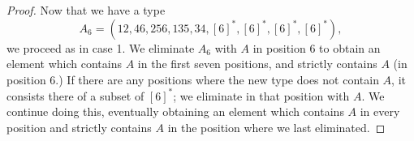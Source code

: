 \documentclass[11pt]{amsart}
\begin{document}
\begin{proof}
Now that we have a type 
\[
A_6=(12,46,256,135,34, [6]^*, [6]^*, [6]^*, [6]^*),
\]
we proceed as in case 1. We eliminate $A_6$ with $A$ in position 6 to obtain an element which contains $A$ in 
the first seven positions, and 
strictly contains $A$ (in position 6.) If there are any positions where the new type does not contain $A$, it 
consists there of a subset of 
$[6]^*$; we eliminate in that position with $A$. We continue doing this, eventually obtaining an element which contains $A$ in every position and strictly contains 
$A$ in the position where we last eliminated.
\end{proof}


\end{document}
